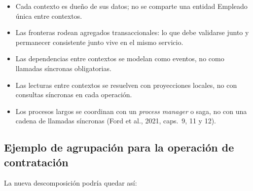 \documentclass[12pt,a4paper]{article}
\begin{document}
\begin{itemize}[label=$\cdot$]
  \item Cada contexto es dueño de sus datos; no se comparte una entidad Empleado única entre contextos.
  \item Las fronteras rodean agregados transaccionales: lo que debe validarse junto y permanecer consistente junto vive en el mismo servicio.
  \item Las dependencias entre contextos se modelan como eventos, no como llamadas síncronas obligatorias.
  \item Las lecturas entre contextos se resuelven con proyecciones locales, no con consultas síncronas en cada operación.
  \item Los procesos largos se coordinan con un \emph{process manager} o saga, no con una cadena de llamadas síncronas (Ford et al., 2021, caps.~9, 11 y 12).
\end{itemize}

\subsection{Ejemplo de agrupación para la operación de contratación}

La nueva descomposición podría quedar así:
\end{document}
